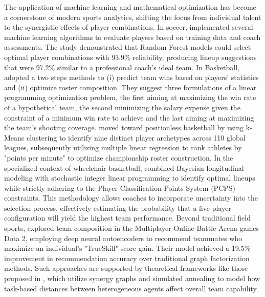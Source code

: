The application of machine learning and mathematical optimization has become a cornerstone of modern sports analytics, shifting the focus from individual talent to the synergistic effects of player combinations. 
In soccer, \cite{Abidin2021ACS} implemented several machine learning algorithms to evaluate players based on training data and coach assessments. 
The study demonstrated that Random Forest models could select optimal player combinations with 93.9\% reliability, producing lineup suggestions that were 97.2\% similar to a professional coach's ideal team.
In Basketball, \cite{Siddique2025FindingOT} adopted a two steps methods to (i) predict team wins based on players' statistics and (ii) optimize roster composition. 
They suggest three formulations of a linear programming optimization problem, the first aiming at maximizing the win rate of a hypothetical team, the second minimizing the salary expense given the constraint of a minimum win rate to achieve and the last aiming at maximizing the team's shooting coverage.
\cite{Penner2025player} moved toward positionless basketball by using k-Means clustering to identify nine distinct player archetypes across 110 global leagues, subsequently utilizing multiple linear regression to rank athletes by "points per minute" to optimize championship roster construction.
In the specialized context of wheelchair basketball, \cite{calvo_selecting_2025} combined Bayesian longitudinal modeling with stochastic integer linear programming to identify optimal lineups while strictly adhering to the Player Classification Points System (PCPS) constraints. 
This methodology allows coaches to incorporate uncertainty into the selection process, effectively estimating the probability that a five-player configuration will yield the highest team performance.
Beyond traditional field sports, \cite{Sapienza2019deep} explored team composition in the Multiplayer Online Battle Arena games Dota 2, employing deep neural autoencoders to recommend teammates who maximize an individual's "TrueSkill" score gain. 
Their model achieved a 19.5\% improvement in recommendation accuracy over traditional graph factorization methods. 
Such approaches are supported by theoretical frameworks like those proposed in \cite{Liemhetcharat2012ModelingAL}, which utilize synergy graphs and simulated annealing to model how task-based distances between heterogeneous agents affect overall team capability.
